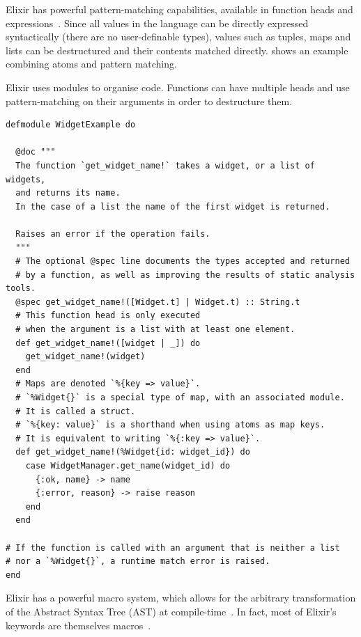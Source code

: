Elixir has powerful pattern-matching capabilities, available in function heads and  expressions~\cite[p.~13]{Thomas:2016}.
Since all values in the language can be directly expressed syntactically (there are no user-definable types), values such as tuples, maps and lists can be destructured and their contents matched directly.
 shows an example combining atoms and pattern matching.

\begin{listing}[h]
	\caption[An example Elixir module, showcasing pattern-matching.]{Elixir uses modules to organise code. Functions can have multiple heads and use pattern-matching on their arguments in order to destructure them.}
	\label{lst:prep:pattern-matching-example}
	\begin{verbatim}
defmodule WidgetExample do

  @doc """
  The function `get_widget_name!` takes a widget, or a list of widgets,
  and returns its name.
  In the case of a list the name of the first widget is returned.

  Raises an error if the operation fails. 
  """
  # The optional @spec line documents the types accepted and returned
  # by a function, as well as improving the results of static analysis tools. 
  @spec get_widget_name!([Widget.t] | Widget.t) :: String.t
  # This function head is only executed
  # when the argument is a list with at least one element.
  def get_widget_name!([widget | _]) do
    get_widget_name!(widget)
  end
  # Maps are denoted `%{key => value}`.
  # `%Widget{}` is a special type of map, with an associated module.
  # It is called a struct.
  # `%{key: value}` is a shorthand when using atoms as map keys.
  # It is equivalent to writing `%{:key => value}`.  
  def get_widget_name!(%Widget{id: widget_id}) do
    case WidgetManager.get_name(widget_id) do
      {:ok, name} -> name
      {:error, reason} -> raise reason
    end
  end

# If the function is called with an argument that is neither a list
# nor a `%Widget{}`, a runtime match error is raised.
end
	\end{verbatim}
\end{listing}

Elixir has a powerful macro system, which allows for the arbitrary transformation of the Abstract Syntax Tree (AST) at compile-time~\cite[p.~13]{Elixir-Metaprogramming}.
In fact, most of Elixir's keywords are themselves macros~\cite[p.~21]{Elixir-Metaprogramming}.

